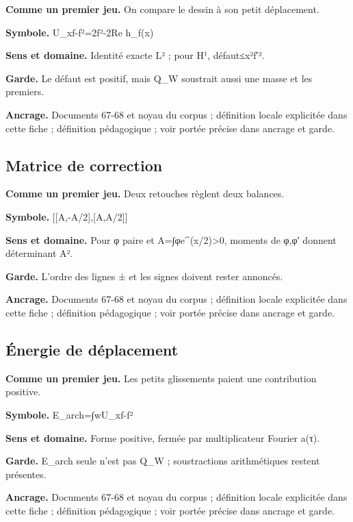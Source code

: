 \documentclass[
  9pt,
  a4paper,
]{article}
\begin{document}
\textbf{Comme un premier jeu.} On compare le dessin à son petit
déplacement.

\textbf{Symbole.}
\textbar\textbar U\_xf-f\textbar\textbar²=2\textbar\textbar f\textbar\textbar²-2Re
h\_f(x)

\textbf{Sens et domaine.} Identité exacte L² ; pour H¹,
défaut≤x²\textbar\textbar f′\textbar\textbar².

\textbf{Garde.} Le défaut est positif, mais Q\_W soustrait aussi une
masse et les premiers.

\textbf{Ancrage.} Documents 67-68 et noyau du corpus ; définition locale
explicitée dans cette fiche ; définition pédagogique ; voir portée
précise dans ancrage et garde.

\hypertarget{matrice-de-correction}{%
\subsection{Matrice de correction}\label{matrice-de-correction}}

\textbf{Comme un premier jeu.} Deux retouches règlent deux balances.

\textbf{Symbole.} {[}{[}A,-A/2{]},{[}A,A/2{]}{]}

\textbf{Sens et domaine.} Pour φ paire et A=∫φe\^{}(x/2)\textgreater0,
moments de φ,φ′ donnent déterminant A².

\textbf{Garde.} L'ordre des lignes ± et les signes doivent rester
annoncés.

\textbf{Ancrage.} Documents 67-68 et noyau du corpus ; définition locale
explicitée dans cette fiche ; définition pédagogique ; voir portée
précise dans ancrage et garde.

\hypertarget{uxe9nergie-de-duxe9placement}{%
\subsection{Énergie de déplacement}\label{uxe9nergie-de-duxe9placement}}

\textbf{Comme un premier jeu.} Les petits glissements paient une
contribution positive.

\textbf{Symbole.} E\_arch=∫w\textbar\textbar U\_xf-f\textbar\textbar²

\textbf{Sens et domaine.} Forme positive, fermée par multiplicateur
Fourier a(τ).

\textbf{Garde.} E\_arch seule n'est pas Q\_W ; soustractions
arithmétiques restent présentes.

\textbf{Ancrage.} Documents 67-68 et noyau du corpus ; définition locale
explicitée dans cette fiche ; définition pédagogique ; voir portée
précise dans ancrage et garde.
\end{document}
